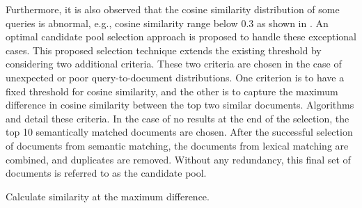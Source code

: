Furthermore, it is also observed that the cosine similarity distribution of some queries is abnormal, e.g., cosine similarity range below 0.3 as shown in . An optimal candidate pool selection approach is proposed to handle these exceptional cases. This proposed selection technique extends the existing threshold by considering two additional criteria. These two criteria are chosen in the case of unexpected or poor query-to-document distributions. One criterion is to have a fixed threshold for cosine similarity, and the other is to capture the maximum difference in cosine similarity between the top two similar documents. Algorithms  and  detail these criteria. In the case of no results at the end of the selection, the top 10 semantically matched documents are chosen. After the successful selection of documents from semantic matching, the documents from lexical matching are combined, and duplicates are removed. Without any redundancy, this final set of documents is referred to as the candidate pool.

 
 \begin{algorithm}[H]
 	\DontPrintSemicolon
 	
 	
 	
 	
 	\caption{Calculate similarity at the maximum difference.} \label{algo:max_diff}
 \end{algorithm}

